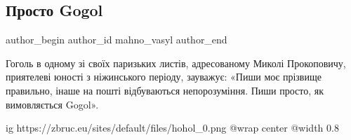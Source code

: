  
 
 
 
 
 
\subsection{Просто Gogol}
\label{sec:12_02_2022.stz.news.ua.zbruc.1.prosto_gogol}
 
\ifcmt
 author_begin
   author_id mahno_vasyl
 author_end
\fi

Гоголь в одному зі своїх паризьких листів, адресованому Миколі Прокоповичу,
приятелеві юності з ніжинського періоду, зауважує: «Пиши моє прізвище
правильно, інаше на пошті відбуваються непорозуміння. Пиши просто, як
вимовляється Gogol». 

\ifcmt
  ig https://zbruc.eu/sites/default/files/hohol_0.png
  @wrap center
  @width 0.8
\fi

